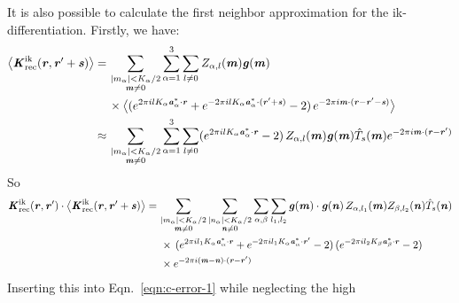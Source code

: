 \documentclass[aps,pre,preprint,unsortedaddress]{revtex4}
\newcommand{\redc}[1]{{\color{red} #1}}
\renewcommand{\v}[1]{\textbf{\textit{#1}}}
\begin{document}
It is also possible to calculate the first neighbor approximation for the
ik-differentiation. Firstly, we have:
\begin{align}\nonumber
  \big\langle
  \v K^{\textrm{ik}}_{\textrm{rec}}(\v r, \v r'+\v s)
  \big\rangle
  = \,&
  \sum_{
    \begin{subarray}{c}
      \vert m_{\alpha}\vert < K_\alpha/2\\
      \v m\neq 0
    \end{subarray}}
  \sum_{\alpha=1}^3\sum_{l\neq 0}
  Z_{\alpha,l}(\v m)
  \v g(\v m) \\ \nonumber
  \,&
  \times
  \big\langle
  (
  e^{2\pi i l K_\alpha\v a^\ast_\alpha\cdot \v r} +
  e^{-2\pi i l K_\alpha\v a^\ast_\alpha\cdot (\v r' + \v s)}
  - 2
  )\,
  e^{-2\pi i\v m\cdot(\v r-\v r' -\v s)}
  \big\rangle \\
  \approx\,&
  \sum_{
    \begin{subarray}{c}
      \vert m_{\alpha}\vert < K_\alpha/2\\
      \v m\neq 0
    \end{subarray}}
  \sum_{\alpha=1}^3\sum_{l\neq 0}
  (
  e^{2\pi i l K_\alpha\v a^\ast_\alpha\cdot \v r} 
  - 2
  )\,
  Z_{\alpha,l}(\v m)
  \v g(\v m)
  \hat T_s(\v m)
  e^{-2\pi i\v m\cdot(\v r-\v r')}  
\end{align}
So
\begin{align}\nonumber
  \v K^{\textrm{ik}}_{\textrm{rec}}(\v r,\v r')\cdot
  \big\langle
  \v K^{\textrm{ik}}_{\textrm{rec}}(\v r, \v r'+\v s)
  \big\rangle
  =\,&
  \sum_{
    \begin{subarray}{c}
      \vert m_{\alpha}\vert < K_\alpha/2\\
      \v m\neq 0
    \end{subarray}}
  \sum_{
    \begin{subarray}{c}
      \vert n_{\alpha}\vert < K_\alpha/2\\
      \v n\neq 0
    \end{subarray}}
  \sum_{\alpha,\beta}
  \sum_{l_1,l_2}
  \v g(\v m)\cdot\v g(\v n)\,
  Z_{\alpha,l_1}(\v m)Z_{\beta,l_2}(\v n)\hat T_s(\v n)
  \\\nonumber
  &\,
  \times
  \,(
  e^{2\pi i l_1 K_\alpha\v a^\ast_\alpha\cdot \v r} +
  e^{-2\pi i l_1 K_\alpha\v a^\ast_\alpha\cdot \v r'}
  - 2
  )
  \,(
  e^{-2\pi i l_2 K_\beta\v a^\ast_\beta\cdot \v r}
  - 2
  )\\
  &\,
  \times
  e^{-2\pi i(\v m-\v n)\cdot(\v r-\v r')}
\end{align}
Inserting \redc{this} into Eqn.~\eqref{eqn:c-error-1} \redc{while neglecting} the high
\end{document}
